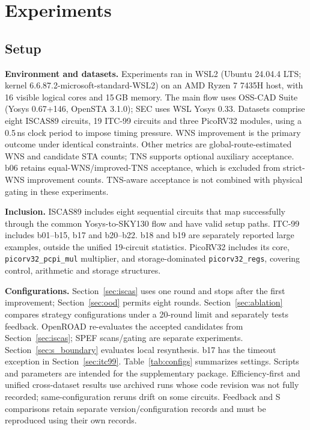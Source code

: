 \documentclass[preprint,12pt]{elsarticle}
\begin{document}
\section{Experiments}\label{sec:exp}
\subsection{Setup}\label{sec:setup}
\textbf{Environment and datasets.} Experiments ran in WSL2 (Ubuntu 24.04.4 LTS; kernel 6.6.87.2-microsoft-standard-WSL2) on an AMD Ryzen 7 7435H host, with 16 visible logical cores and 15\,GB memory. The main flow uses OSS-CAD Suite (Yosys 0.67+146, OpenSTA 3.1.0); SEC uses WSL Yosys 0.33. Datasets comprise eight ISCAS89 circuits, 19 ITC-99 circuits and three PicoRV32 modules, using a 0.5\,ns clock period to impose timing pressure. WNS improvement is the primary outcome under identical constraints. Other metrics are global-route-estimated WNS and candidate STA counts; TNS supports optional auxiliary acceptance. b06 retains equal-WNS/improved-TNS acceptance, which is excluded from strict-WNS improvement counts. TNS-aware acceptance is not combined with physical gating in these experiments.

\textbf{Inclusion.} ISCAS89 includes eight sequential circuits that map successfully through the common Yosys-to-SKY130 flow and have valid setup paths. ITC-99 includes b01--b15, b17 and b20--b22. b18 and b19 are separately reported large examples, outside the unified 19-circuit statistics. PicoRV32 includes its core, \texttt{picorv32\_pcpi\_mul} multiplier, and storage-dominated \texttt{picorv32\_regs}, covering control, arithmetic and storage structures.

\textbf{Configurations.} Section~\ref{sec:iscas} uses one round and stops after the first improvement; Section~\ref{sec:ood} permits eight rounds. Section~\ref{sec:ablation} compares strategy configurations under a 20-round limit and separately tests feedback. OpenROAD re-evaluates the accepted candidates from Section~\ref{sec:iscas}; SPEF scans/gating are separate experiments. Section~\ref{sec:s_boundary} evaluates local resynthesis. b17 has the timeout exception in Section~\ref{sec:itc99}. Table~\ref{tab:configs} summarizes settings. Scripts and parameters are intended for the supplementary package. Efficiency-first and unified cross-dataset results use archived runs whose code revision was not fully recorded; same-configuration reruns drift on some circuits. Feedback and S comparisons retain separate version/configuration records and must be reproduced using their own records.
\end{document}
